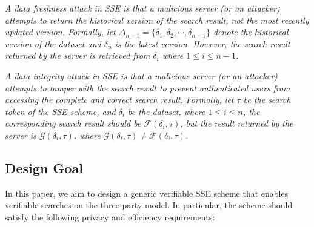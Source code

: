 \begin{definition}\label{def:freshness}
    {\itshape
      A data freshness attack in SSE is that a malicious server (or an attacker) attempts to return the historical version of the search result, not the most recently updated version. Formally, let $\Delta_{n-1} = \{\delta_1,\delta_2,\cdots,\delta_{n-1}\}$ denote the historical version of the dataset and $\delta_n$ is the latest version. However, the search result returned by the server is retrieved from $\delta_i$ where $1 \le i \le n-1$.
    }
\end{definition}

\begin{definition}\label{def:integrity}
    {\itshape
      A data integrity attack in SSE is that a malicious server (or an attacker) attempts to tamper with the search result to prevent authenticated users from accessing the complete and correct search result. Formally, let $\tau$ be the search token of the SSE scheme, and $\delta_i$ be the dataset, where $1 \le i \le n$, the corresponding search result should be $\mathcal{F}(\delta_i, \tau)$, but the result returned by the server is $\mathcal{G}(\delta_i, \tau)$, where $\mathcal{G}(\delta_i, \tau) \neq \mathcal{F}(\delta_i, \tau)$.
    }
\end{definition}



\subsection{Design Goal}
  In this paper, we aim to design a generic verifiable SSE scheme that enables verifiable searches on the three-party model. In particular, the scheme should satisfy the following privacy and efficiency requirements:


